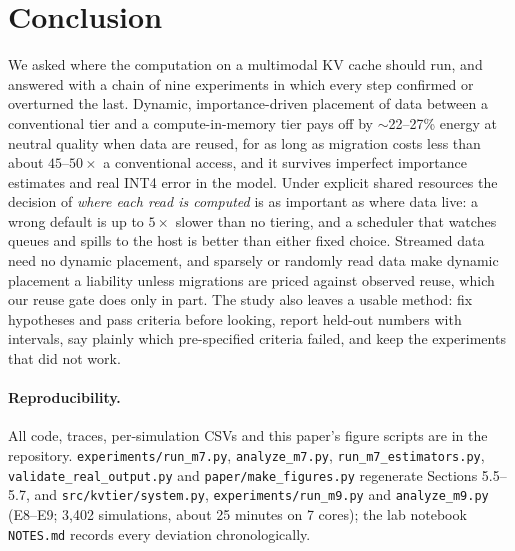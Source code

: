 \documentclass[10pt,a4paper]{article}
\begin{document}
\section{Conclusion}
We asked where the computation on a multimodal KV cache should run, and answered with a chain of nine experiments in which every step confirmed or overturned the last. Dynamic, importance-driven placement of data between a conventional tier and a compute-in-memory tier pays off by $\sim$22--27\% energy at neutral quality when data are reused, for as long as migration costs less than about $45$--$50\times$ a conventional access, and it survives imperfect importance estimates and real INT4 error in the model. Under explicit shared resources the decision of \emph{where each read is computed} is as important as where data live: a wrong default is up to $5\times$ slower than no tiering, and a scheduler that watches queues and spills to the host is better than either fixed choice. Streamed data need no dynamic placement, and sparsely or randomly read data make dynamic placement a liability unless migrations are priced against observed reuse, which our reuse gate does only in part. The study also leaves a usable method: fix hypotheses and pass criteria before looking, report held-out numbers with intervals, say plainly which pre-specified criteria failed, and keep the experiments that did not work.

\paragraph{Reproducibility.} All code, traces, per-simulation CSVs and this paper's figure scripts are in the repository. \texttt{experiments/run\_m7.py}, \texttt{analyze\_m7.py}, \texttt{run\_m7\_estimators.py}, \texttt{validate\_real\_output.py} and \texttt{paper/make\_figures.py} regenerate Sections 5.5--5.7, and \texttt{src/kvtier/system.py}, \texttt{experiments/run\_m9.py} and \texttt{analyze\_m9.py} (E8--E9; 3,402 simulations, about 25 minutes on 7 cores); the lab notebook \texttt{NOTES.md} records every deviation chronologically.
\end{document}
